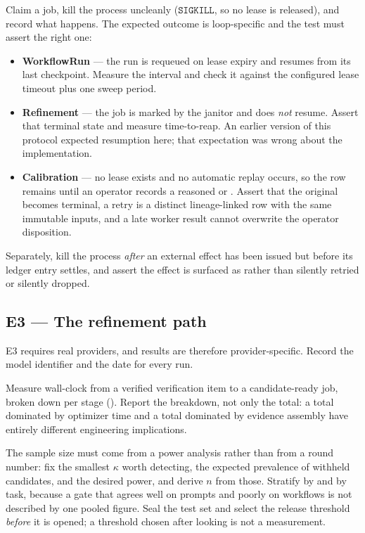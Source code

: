  Claim a job, kill the process
uncleanly ($\mathtt{SIGKILL}$, so no lease is released), and record what happens.
The expected outcome is loop-specific and the test must assert the right one:

\begin{itemize}
\item \textbf{WorkflowRun} --- the run is requeued on lease expiry and resumes from
      its last checkpoint. Measure the interval and check it against the configured
      lease timeout plus one sweep period.
\item \textbf{Refinement} --- the job is marked  by the janitor and
      does \emph{not} resume. Assert that terminal state and measure time-to-reap.
      An earlier version of this protocol expected resumption here; that
      expectation was wrong about the implementation.
\item \textbf{Calibration} --- no lease exists and no automatic replay occurs, so
      the row remains  until an operator records a reasoned
       or . Assert that the original becomes terminal,
      a retry is a distinct lineage-linked row with the same immutable inputs, and
      a late worker result cannot overwrite the operator disposition.
\end{itemize}

Separately, kill the process \emph{after} an external effect has been issued but
before its ledger entry settles, and assert the effect is surfaced as
 rather than silently retried or silently dropped.

\subsection{E3 --- The refinement path}

E3 requires real providers, and results are therefore provider-specific. Record the
model identifier and the date for every run.

 Measure wall-clock from a verified
verification item to a candidate-ready job, broken down per stage
(). Report the breakdown, not only the total: a total dominated
by optimizer time and a total dominated by evidence assembly have entirely different
engineering implications.

 The sample size must come from
a power analysis rather than from a round number: fix the smallest $\kappa$ worth
detecting, the expected prevalence of withheld candidates, and the desired power,
and derive $n$ from those. Stratify by \family and by task, because a gate that
agrees well on prompts and poorly on workflows is not described by one pooled
figure. Seal the test set and select the release threshold \emph{before} it is
opened; a threshold chosen after looking is not a measurement.

